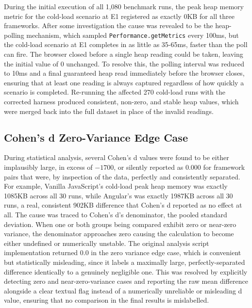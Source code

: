 \documentclass[11pt,a4paper]{report}
\begin{document}
During the initial execution of all 1,080 benchmark runs, the peak heap memory metric for the cold-load scenario at E1 registered as exactly 0KB for all three frameworks. After some investigation the cause was revealed to be the heap-polling mechanism, which sampled \texttt{Performance.getMetrics} every 100ms, but the cold-load scenario at E1 completes in as little as 35-65ms, faster than the poll can fire. The browser closed before a single heap reading could be taken, leaving the initial value of 0 unchanged. To resolve this, the polling interval was reduced to 10ms and a final guaranteed heap read immediately before the browser closes, ensuring that at least one reading is always captured regardless of how quickly a scenario is completed. Re-running
the affected 270 cold-load runs with the corrected harness produced consistent, non-zero, and stable heap values, which were merged back into the full dataset in place of the invalid readings. 

\subsection{Cohen's d Zero-Variance Edge Case}

During statistical analysis, several Cohen's d values were found to be either implausibly large, in excess of $-1700$, or silently reported as $0.000$ for framework pairs that were, by inspection of the data, perfectly and consistently separated. For example, Vanilla JavaScript's cold-load peak heap memory was exactly 1085KB across all 30 runs, while Angular's was exactly 1987KB across all 30 runs, a real, consistent 902KB difference that Cohen's d reported as no effect at all. The cause was traced to Cohen's d's
denominator, the pooled standard deviation. When one or both groups being compared exhibit zero or near-zero variance, the denominator approaches zero causing the calculation to become either undefined or numerically unstable. The original analysis script implementation returned 0.0 in the zero variance edge case, which is convenient but statistically misleading, since it labels a maximally large, perfectly-separated difference identically to a genuinely negligible one. This was resolved by explicitly detecting zero and near-zero-variance cases and reporting the raw mean difference alongside a clear textual flag instead of a numerically unreliable or misleading d value, ensuring that no
comparison in the final results is mislabelled.


\end{document}
